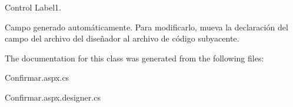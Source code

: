 Control Label1. 

Campo generado automáticamente. Para modificarlo, mueva la declaración del campo del archivo del diseñador al archivo de código subyacente. 

The documentation for this class was generated from the following files\+:\begin{DoxyCompactItemize}
\item 
Confirmar.\+aspx.\+cs\item 
Confirmar.\+aspx.\+designer.\+cs\end{DoxyCompactItemize}
